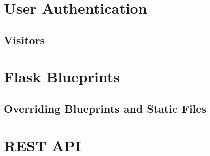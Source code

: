 \section{User Authentication}
\label{sec:user-authentication}


\subsection{Visitors}
\label{sec:visitors}


\section{Flask Blueprints}


\subsection{Overriding Blueprints and Static Files}
\label{sec:override-blueprints}


\section{REST API}
\label{sec:rest-api}

